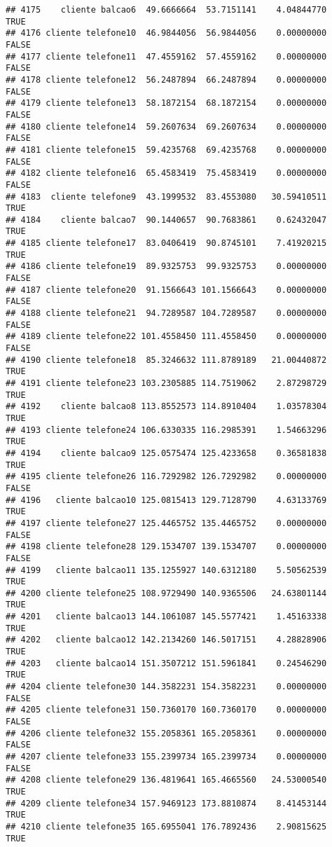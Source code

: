 \documentclass[
]{article}
\begin{document}
\begin{verbatim}
## 4175    cliente balcao6  49.6666664  53.7151141    4.04844770     TRUE
## 4176 cliente telefone10  46.9844056  56.9844056    0.00000000    FALSE
## 4177 cliente telefone11  47.4559162  57.4559162    0.00000000    FALSE
## 4178 cliente telefone12  56.2487894  66.2487894    0.00000000    FALSE
## 4179 cliente telefone13  58.1872154  68.1872154    0.00000000    FALSE
## 4180 cliente telefone14  59.2607634  69.2607634    0.00000000    FALSE
## 4181 cliente telefone15  59.4235768  69.4235768    0.00000000    FALSE
## 4182 cliente telefone16  65.4583419  75.4583419    0.00000000    FALSE
## 4183  cliente telefone9  43.1999532  83.4553080   30.59410511     TRUE
## 4184    cliente balcao7  90.1440657  90.7683861    0.62432047     TRUE
## 4185 cliente telefone17  83.0406419  90.8745101    7.41920215     TRUE
## 4186 cliente telefone19  89.9325753  99.9325753    0.00000000    FALSE
## 4187 cliente telefone20  91.1566643 101.1566643    0.00000000    FALSE
## 4188 cliente telefone21  94.7289587 104.7289587    0.00000000    FALSE
## 4189 cliente telefone22 101.4558450 111.4558450    0.00000000    FALSE
## 4190 cliente telefone18  85.3246632 111.8789189   21.00440872     TRUE
## 4191 cliente telefone23 103.2305885 114.7519062    2.87298729     TRUE
## 4192    cliente balcao8 113.8552573 114.8910404    1.03578304     TRUE
## 4193 cliente telefone24 106.6330335 116.2985391    1.54663296     TRUE
## 4194    cliente balcao9 125.0575474 125.4233658    0.36581838     TRUE
## 4195 cliente telefone26 116.7292982 126.7292982    0.00000000    FALSE
## 4196   cliente balcao10 125.0815413 129.7128790    4.63133769     TRUE
## 4197 cliente telefone27 125.4465752 135.4465752    0.00000000    FALSE
## 4198 cliente telefone28 129.1534707 139.1534707    0.00000000    FALSE
## 4199   cliente balcao11 135.1255927 140.6312180    5.50562539     TRUE
## 4200 cliente telefone25 108.9729490 140.9365506   24.63801144     TRUE
## 4201   cliente balcao13 144.1061087 145.5577421    1.45163338     TRUE
## 4202   cliente balcao12 142.2134260 146.5017151    4.28828906     TRUE
## 4203   cliente balcao14 151.3507212 151.5961841    0.24546290     TRUE
## 4204 cliente telefone30 144.3582231 154.3582231    0.00000000    FALSE
## 4205 cliente telefone31 150.7360170 160.7360170    0.00000000    FALSE
## 4206 cliente telefone32 155.2058361 165.2058361    0.00000000    FALSE
## 4207 cliente telefone33 155.2399734 165.2399734    0.00000000    FALSE
## 4208 cliente telefone29 136.4819641 165.4665560   24.53000540     TRUE
## 4209 cliente telefone34 157.9469123 173.8810874    8.41453144     TRUE
## 4210 cliente telefone35 165.6955041 176.7892436    2.90815625     TRUE

\end{verbatim}
\end{document}
